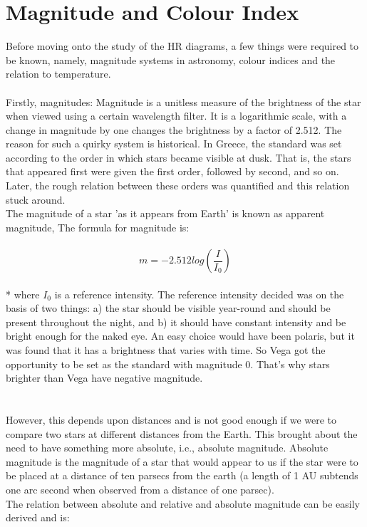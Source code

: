 \documentclass{article}
\begin{document}
\section{Magnitude and Colour Index}
\large Before moving onto the study of the HR diagrams, a few things were required to be known, namely, magnitude systems in astronomy, colour indices and the relation to temperature.\\
\\
Firstly, magnitudes: Magnitude is a unitless measure of the brightness of the star when viewed using a certain wavelength filter. It is a logarithmic scale, with a change in magnitude by one changes the brightness by a factor of 2.512. The reason for such a quirky system is historical. In Greece, the standard was set according to the order in which stars became visible at dusk. That is, the stars that appeared first were given the first order, followed by second, and so on. Later, the rough relation between these orders was quantified and this relation stuck around.\\
The magnitude of a star 'as it appears from Earth' is known as apparent magnitude, The formula for magnitude is: \\
\\
$${ m=-2.512 log(\frac{I}{I_0})}$$\\* where $I_0$ is a reference intensity. The reference intensity decided was on the basis of two things: a) the star should be visible year-round and should be present throughout the night, and b) it should have constant intensity and be bright enough for the naked eye. An easy choice would have been polaris, but it was found that it has a brightness that varies with time. So Vega got the opportunity to be set as the standard with magnitude 0. That's why stars brighter than Vega have negative magnitude.\\
 \\
 \\
However, this depends upon distances and is not good enough if we were to compare two stars at different distances from the Earth. This brought about the need to have something more absolute, i.e., absolute magnitude. Absolute magnitude is the magnitude of a star that would appear to us if the star were to be placed at a distance of ten parsecs from the earth (a length of 1 AU subtends one arc second when observed from a distance of one parsec). \\
The relation between absolute and relative and absolute magnitude can be easily derived and is:\\
\end{document}
